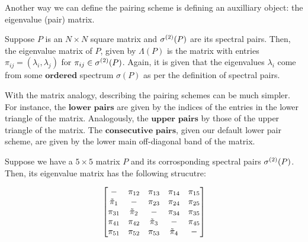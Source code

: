 \noindent Another way we can define the pairing scheme is defining an auxilliary object: the eigenvalue (pair) matrix.


\newpage
{}
\begin{definition}
Suppose $P$ is an $N \times N$ square matrix and ${\sigma^{(2)}}(P)$ are its spectral pairs. Then, the eigenvalue matrix of $P$, given by $\Lambda(P)$ is the matrix with entries $\pi_{ij} = (\lambda_i, \lambda_j)$ for ${\pi_{ij}} \in {\sigma^{(2)}}(P)$. Again, it is given that the eigenvalues $\lambda_i$ come from some $\textbf{ordered}$ spectrum $\sigma(P)$ as per the definition of spectral pairs.
\end{definition}

With the matrix analogy, describing the pairing schemes can be much simpler. For instance, the $\textbf{lower pairs}$ are given by the indices of the entries in the lower triangle of the matrix. Analogously, the $\textbf{upper pairs}$ by those of the upper triangle of the matrix. The $\textbf{consecutive pairs}$, given our default lower pair scheme, are given by the lower main off-diagonal band of the matrix.

\begin{example}
Suppose we have a $5 \times 5$ matrix $P$ and its corrosponding spectral pairs ${\sigma^{(2)}}(P)$. Then, its eigenvalue matrix has the following strucutre:
\end{example}
$$
\begin{bmatrix}
-      & \pi_{12} & \pi_{13}   & \pi_{14} & \pi_{15} \\
{\tilde{\pi}}_{1} & -      & \pi_{23}   & \pi_{24} & \pi_{25} \\
\pi_{31} & {\tilde{\pi}}_{2} & -        & \pi_{34} & \pi_{35} \\
\pi_{41} & \pi_{42} & {\tilde{\pi}}_{3} & -        & \pi_{45} \\
\pi_{51} & \pi_{52} & \pi_{53} & {\tilde{\pi}}_{4} & -        \\
\end{bmatrix}
$$
\newline

\newpage
